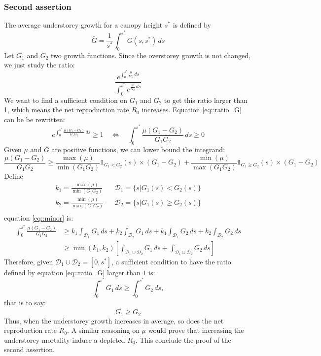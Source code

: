 \documentclass[letterpaper, 12pt]{article}
\newcommand {\s}{{s}^{*}}
\theoremstyle{theo}
\begin{document}
\begin{refsection}
\begin{onehalfspace}
\subsubsection{Second assertion}
The average understorey growth for a canopy height $ \s $ is defined by
\[
	\bar{G} = \frac{1}{\s} \int_0^{\s} G(s, \s) \, ds
\]
Let $ G_1 $ and $ G_2 $ two growth functions. Since the overstorey growth is not changed, we just study the ratio:
\begin{equation} \label{eq::ratio_G}
	\frac{e^{\int_0^{\s} \frac{\mu}{G_1} \, ds}}{\int_0^{\s}e^{\frac{\mu}{G_2} \, ds}}
\end{equation}
We want to find a sufficient condition on $ G_1 $ and $ G_2 $ to get this ratio larger than 1, which means the net reproduction rate $ R_0 $ increases. Equation \eqref{eq::ratio_G} can be be rewritten:
\[
	e^{\int_0^{\s} \frac{\mu (G_1 - G_2)}{G_1 G_2} \, ds} \geqslant 1 \quad \Leftrightarrow \quad \int_0^{\s} \frac{\mu (G_1 - G_2)}{G_1 G_2} \, ds \geqslant 0
\]
Given $ \mu $ and $ G $ are positive functions, we can lower bound the integrand:
\begin{equation} \label{eq::minor}
	\frac{\mu (G_1 - G_2)}{G_1 G_2} \geqslant \frac{\max(\mu)}{\min(G_1 G_2)} \mathds{1}_{G_1 < G_2} (s) \times (G_1 - G_2) + \frac{\min(\mu)}{\max(G_1 G_2)} \mathds{1}_{G_1 \geqslant G_2}(s) \times (G_1 - G_2)
\end{equation}
Define
\[
	\begin{matrix}
		k_1 = \frac{\max(\mu)}{\min(G_1 G_2)} & &
			\mathscr{D}_1 = \{ s | G_1(s) < G_2(s) \} \\
		k_2 = \frac{\min(\mu)}{\max(G_1 G_2)} & &
				\mathscr{D}_2 = \{ s | G_1(s) \geqslant G_2(s) \}\\
	\end{matrix}
\]
equation \eqref{eq::minor} is:
\begin{align*}
	\int_0^{\s} \frac{\mu (G_1 - G_2)}{G_1 G_2} &\geqslant
		k_1 \int_{\mathscr{D}_1} G_1  \, ds + k_2 \int_{\mathscr{D}_2} G_1 \, ds +
		k_1 \int_{\mathscr{D}_1} G_2  \, ds + k_2 \int_{\mathscr{D}_2} G_2 \, ds \\
	&\geqslant \min (k_1, k_2) \left[\int_{\mathscr{D}_1 \cup \mathscr{D}_2} G_1 \, ds + \int_{\mathscr{D}_1 \cup \mathscr{D}_2} G_2 \, ds \right]
\end{align*}
Therefore, given $ \mathscr{D}_1 \cup \mathscr{D}_2 = [0, \s] $, a sufficient condition to have the ratio defined by equation \eqref{eq::ratio_G} larger than $ 1 $ is:
\begin{equation}
	\int_0^{\s} G_1 \, ds \geqslant \int_0^{\s} G_2 \, ds,
\end{equation}
that is to say:
\[
	\bar{G}_1 \geqslant \bar{G}_2
\]
Thus, when the understorey growth increases in average, so does the net reproduction rate $ R_0 $. A similar reasoning on $ \mu $ would prove that increasing the understorey mortality induce a depleted $ R_0 $. This conclude the proof of the second assertion.


\end{onehalfspace}
\end{refsection}
\end{document}

